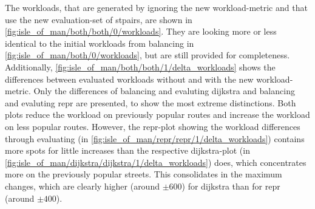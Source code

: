         The workloads, that are generated by ignoring the new workload-\gls{metric} and that use the new evaluation-set of \glspl{stpair}, are shown in \vref{fig:isle_of_man/both/both/0/workloads}.
        They are looking more or less identical to the initial workloads from \gls{balancing} in \vref{fig:isle_of_man/both/0/workloads}, but are still provided for completeness.
        Additionally, \cref{fig:isle_of_man/both/both/1/delta_workloads} shows the differences between evaluated workloads without and with the new workload-\gls{metric}.
        Only the differences of \gls{balancing} and evaluting \gls{dijkstra} and \gls{balancing} and evaluting \gls{repr} are presented, to show the most extreme distinctions.
        Both plots reduce the workload on previously popular routes and increase the workload on less popular routes.
        However, the \gls{repr}-plot showing the workload differences through evaluating (in \cref{fig:isle_of_man/repr/repr/1/delta_workloads}) contains more spots for little increases than the respective \gls{dijkstra}-plot (in \cref{fig:isle_of_man/dijkstra/dijkstra/1/delta_workloads}) does, which concentrates more on the previously popular streets.
        This consolidates in the maximum changes, which are clearly higher (around $\pm 600$) for \gls{dijkstra} than for \gls{repr} (around $\pm 400$).

